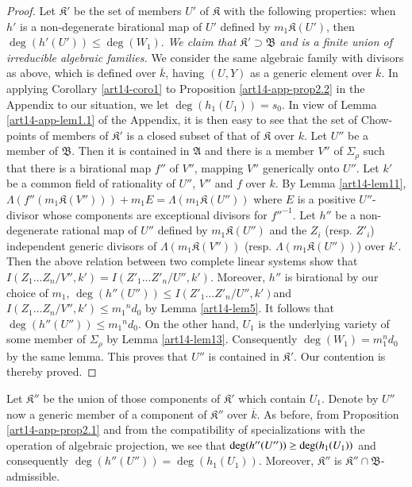 \begin{proof}
Let $\mathfrak{K}'$ be the set of members $U'$ of $\mathfrak{K}$ with the following properties: when $h'$ is a non-degenerate birational map of $U'$ defined by $m_{1}\mathfrak{K}(U')$, then $\deg(h'(U'))\leq \deg(W_{1})$. {\em We claim that $\mathfrak{K}'\supset \mathfrak{B}$ and is a finite union of irreducible algebraic families.} We consider the same algebraic family with divisors as above, which is defined over $\overline{k}$, having $(U,Y)$ as a generic element over $\overline{k}$. In applying Corollary \ref{art14-coro1} to Proposition \ref{art14-app-prop2.2} in the Appendix to our situation, we let $\deg(h_{1}(U_{1}))=s_{0}$. In view of Lemma \ref{art14-app-lem1.1} of the Appendix, it is then easy to see that the set of Chow-points of members of $\mathfrak{K}'$ is a closed subset of that of $\mathfrak{K}$ over $k$. Let $U''$ be a member of $\mathfrak{B}$. Then it is contained in $\mathfrak{A}$ and there is a member $V''$ of $\Sigma_{\rho}$ such that there is a birational map $f''$ of $V''$, mapping $V''$ generically onto $U''$. Let $k'$ be a common field of rationality of $U''$, $V''$ and $f$ over $k$. By Lemma \ref{art14-lem11}, $\Lambda(f''(m_{1}\mathfrak{K}(V'')))+m_{1}E=\Lambda(m_{1}\mathfrak{K}(U''))$ where $E$ is a positive $U''$-divisor whose components are exceptional divisors for ${f''}^{-1}$. Let $h''$ be a non-degenerate rational map of $U''$ defined by $m_{1}\mathfrak{K}(U'')$ and the $Z_{i}$ (resp. $Z'_{i}$) independent generic divisors of $\Lambda(m_{1}\mathfrak{K}(V''))$ (resp. $\Lambda(m_{1}\mathfrak{K}(U''))$) over $k'$. Then the above relation between two complete linear systems show that $I(Z_{1}\ldots Z_{n}/V'',k')=I(Z'_{1}\ldots Z'_{n}/U'',k')$. Moreover, $h''$ is birational by our choice of $m_{1}$, $\deg(h''(U''))\leq I(Z'_{1}\ldots Z'_{n}/U'',k')$\pageoriginale and $I(Z_{1}\ldots Z_{n}/V'',k')\leq m_{1}{}^{n}d_{0}$ by Lemma \ref{art14-lem5}. It follows that $\deg(h''(U''))\leq m_{1}{}^{n}d_{0}$. On the other hand, $U_{1}$ is the underlying variety of some member of $\Sigma_{\rho}$ by Lemma \ref{art14-lem13}. Consequently $\deg(W_{1})=m^{n}_{1}d_{0}$ by the same lemma. This proves that $U''$ is contained in $\mathfrak{K}'$. Our contention is thereby proved.
\end{proof}

Let $\mathfrak{K}''$ be the union of those components of $\mathfrak{K}'$ which contain $U_{1}$. Denote by $U''$ now a generic member of a component of $\mathfrak{K}''$ over $\overline{k}$. As before, from Proposition \ref{art14-app-prop2.1} and from the compatibility of specializations with the operation of algebraic projection, we see that $\deg(h''(U''))\break \geq \deg (h_{1}(U_{1}))$ and consequently $\deg(h''(U''))=\deg (h_{1}(U_{1}))$. Moreover, $\mathfrak{K}''$ is $\mathfrak{K}''\cap \mathfrak{B}$-admissible.

